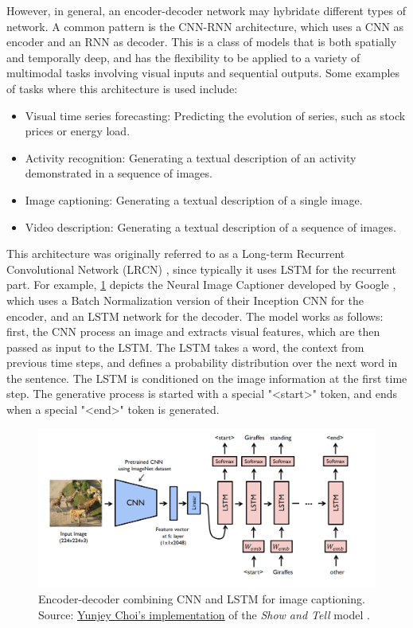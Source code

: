 However, in general, an encoder-decoder network may hybridate different types of network. A common pattern is the CNN-RNN architecture, which uses a CNN as encoder and an RNN as decoder. This is a class of models that is both spatially and temporally deep, and has the flexibility to be applied to a variety of multimodal tasks involving visual inputs and sequential outputs. Some examples of tasks where this architecture is used include:

\begin{itemize}
    \item Visual time series forecasting: Predicting the evolution of series, such as stock prices or energy load.
    \item Activity recognition: Generating a textual description of an activity demonstrated in a sequence of images.
    \item Image captioning: Generating a textual description of a single image.
    \item Video description: Generating a textual description of a sequence of images.
\end{itemize}

This architecture was originally referred to as a Long-term Recurrent Convolutional Network (LRCN) \citep{Donahue2015}, since typically it uses LSTM for the recurrent part. For example, \cref{fig:cnn-rnn} depicts the Neural Image Captioner developed by Google \citep{Vinyals2015}, which uses  a Batch Normalization version of their Inception CNN for the encoder, and an LSTM network for the decoder. The model works as follows: first, the CNN process an image and extracts visual features, which are then passed as input to the LSTM. The LSTM takes a word, the context from previous time steps, and defines a probability distribution over the next word in the sentence. The LSTM is conditioned on the image information at the first time step. The generative process is started with a special "<start>" token, and ends when a special "<end>" token is generated.

\begin{figure}[hpt]
	\centering
	\includegraphics[scale=0.3]{images/ch3/cnn-rnn.png}
	\caption{Encoder-decoder combining CNN and LSTM for image captioning. Source:  \href{https://github.com/yunjey/pytorch-tutorial/tree/master/tutorials/03-advanced/image_captioning}{Yunjey Choi's implementation} of the \textit{Show and Tell} model \citep{Vinyals2015}.}
	\label{fig:cnn-rnn}
\end{figure}

